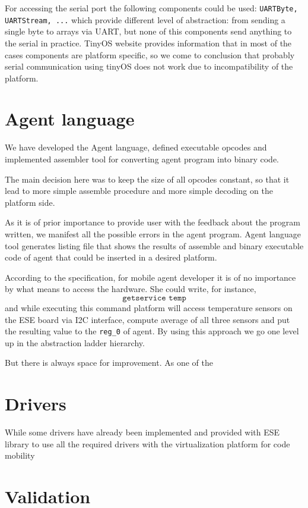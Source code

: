 \documentclass{scrreprt}
\begin{document}
For accessing the serial port the following components could be used: \texttt{UARTByte, UARTStream, ...}
which provide different level of abstraction: from sending a single byte to arrays
via UART, but none of this components send anything to the serial in practice.
TinyOS website provides information that in most of the cases components are 
platform specific, so we come to conclusion that probably serial communication
using tinyOS does not work due to incompatibility of the platform.

\section{Agent language}

We have developed the Agent language, defined executable opcodes and implemented
 assembler tool for  converting agent program 
into binary code.

The main decision here was to keep the size of all opcodes constant,
so that it lead to more simple assemble procedure and more simple decoding
on the platform side.

As it is of prior importance to provide user with the feedback about the 
program written, we manifest all the possible errors in the agent program.
Agent language tool generates listing file that shows the results of assemble and 
binary executable code of agent that could be inserted in a desired platform.

According to the specification, for mobile agent developer it is of no importance
by what means to access the hardware. She could write, for instance,
\[
\texttt{getservice temp}
\]
and while executing this command platform will access temperature
sensors on the ESE board via I2C interface, compute average of all three sensors and 
put the resulting value to the \texttt{reg_0} of agent.
By using this approach we go one level up in the abstraction ladder hierarchy.


But there is always space for improvement. As one of the 

\section{Drivers}

While some drivers have already been implemented and provided with ESE library
to use all the required drivers with the virtualization platform for code mobility 


\section{Validation}
\end{document}
